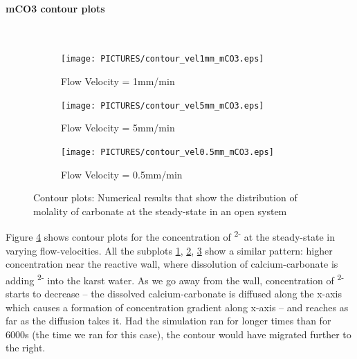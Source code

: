 \paragraph*{mCO3 contour plots} \mbox{}\\

\begin{figure}[!h]
\centering
    \begin{subfigure}{.5\linewidth}
        \centering
        \texttt{[image: PICTURES/contour\_vel1mm\_mCO3.eps]}
        \caption{Flow Velocity = 1mm/min}
        \label{fig:CO3Steady-state}       %
    \end{subfigure}%
    \hfill
    \begin{subfigure}{.5\linewidth}
        \centering
        \texttt{[image: PICTURES/contour\_vel5mm\_mCO3.eps]}
        \caption{Flow Velocity = 5mm/min}
        \label{fig:CO3Steady-state5mm}       %
    \end{subfigure}%
    \hfill
    \begin{subfigure}{.5\linewidth}
        \centering
        \texttt{[image: PICTURES/contour\_vel0.5mm\_mCO3.eps]}
        \caption{Flow Velocity = 0.5mm/min}
        \label{fig:CO3Steady-state0.5mm}       %
    \end{subfigure}%
    \caption{\DuMuX Contour plots: Numerical results that show the distribution of molality of carbonate at the steady-state in an open system}
     \label{fig:contourCO3}
\end{figure}


Figure \ref{fig:contourCO3} shows contour plots for the concentration of \textsuperscript{2-} at the steady-state in varying flow-velocities. All the subplots \ref{fig:CO3Steady-state}, \ref{fig:CO3Steady-state5mm}, \ref{fig:CO3Steady-state0.5mm} show a similar pattern: higher concentration near the reactive wall, where dissolution of calcium-carbonate is adding \textsuperscript{2-} into the karst water. As we go away from the wall, concentration of \textsuperscript{2-} starts to decrease -- the dissolved calcium-carbonate is diffused along the x-axis which causes a formation of concentration gradient along x-axis -- and reaches as far as the diffusion takes it. Had the simulation ran for longer times than for 6000s (the time we ran for this case), the contour would have migrated further to the right. 

